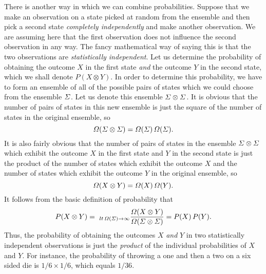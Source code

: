 There is another way in which we can combine probabilities. Suppose 
that we 
make an observation on a state picked at random from the ensemble and then
pick a second state {\em completely independently}\/ and
make another observation. We  are assuming here that the first 
observation does not influence the second observation in 
any way. The fancy mathematical way of saying this is that the two
observations are {\em statistically independent}.
Let us determine the probability of obtaining
the outcome $X$ in the first state {\em and}
 the outcome $Y$ in the second state, which we shall denote
$P(X\otimes Y)$.
 In order to determine this probability, we have to form an ensemble of all
of the possible pairs of states which we could choose from the ensemble
${{\mit\Sigma}}$. Let us denote this ensemble ${{\mit\Sigma}}\otimes {{\mit\Sigma}}$. 
It is obvious that the number of pairs of states in this new 
ensemble is just the
square of the number of states in the original ensemble, so
\begin{equation}
{\mit\Omega}({{\mit\Sigma}}\otimes{{\mit\Sigma}}) = {\mit\Omega}({{\mit\Sigma}})\, {\mit\Omega}({{\mit\Sigma}}).
\end{equation}
It is also fairly obvious that the number of pairs of states
in the ensemble ${{\mit\Sigma}}\otimes {{\mit\Sigma}}$
 which exhibit the
outcome $X$ in the first state and $Y$ in the second state
  is just the
product of the number of states which exhibit the outcome $X$ 
and the number of states which exhibit the outcome $Y$ in the original
ensemble, so
\begin{equation}
{\mit\Omega}(X\otimes Y) = {\mit\Omega}(X) \,{\mit\Omega}(Y).
\end{equation}
It follows from the basic definition of probability that
\begin{equation}
P(X\otimes Y) = ~_{lt\,{\mit\Omega}({\mit\Sigma})\rightarrow\infty}
  \frac{{\mit\Omega}(X\otimes Y)}{{\mit\Omega}({{\mit\Sigma}}\otimes {{\mit\Sigma}})}= P(X) \,P(Y).
\end{equation}
Thus, the probability of obtaining the outcomes $X$ {\em and}
 $Y$ in two statistically independent
observations is just the {\em product}\/ of the individual probabilities of
$X$ and $Y$. For instance, the probability of throwing a one and then a two
on a six sided die is $1/6 \times 1/6$, which equals $1/36$.

